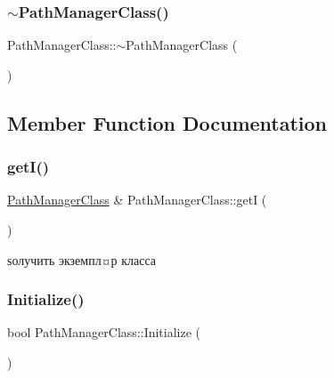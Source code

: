 \subsubsection{\texorpdfstring{$\sim$\+Path\+Manager\+Class()}{~PathManagerClass()}}
{\footnotesize\ttfamily Path\+Manager\+Class\+::$\sim$\+Path\+Manager\+Class (\begin{DoxyParamCaption}{ }\end{DoxyParamCaption})\hspace{0.3cm}{\ttfamily [private]}}



\subsection{Member Function Documentation}
\mbox{\label{class_path_manager_class_ad1fe028daefa3cc848eb2409dded6e51}} 
\subsubsection{\texorpdfstring{get\+I()}{getI()}}
{\footnotesize\ttfamily \hyperlink{class_path_manager_class}{Path\+Manager\+Class} \& Path\+Manager\+Class\+::getI (\begin{DoxyParamCaption}{ }\end{DoxyParamCaption})\hspace{0.3cm}{\ttfamily [static]}}



ѕолучить экземпл¤р класса 

\mbox{\label{class_path_manager_class_a14e53ce1559defc57298eba81b9b5a41}} 
\subsubsection{\texorpdfstring{Initialize()}{Initialize()}}
{\footnotesize\ttfamily bool Path\+Manager\+Class\+::\+Initialize (\begin{DoxyParamCaption}{ }\end{DoxyParamCaption})}

\mbox{\label{class_path_manager_class_a58cc1d2ec7956f2bb24d5383e969eaab}} 
